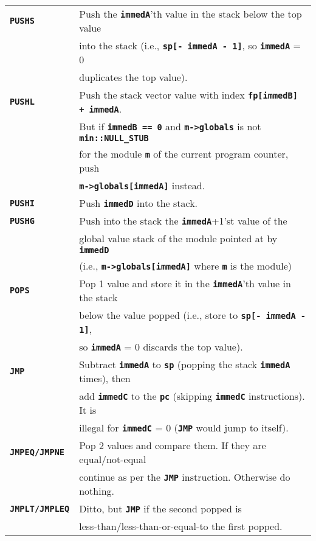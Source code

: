 \documentclass[12pt]{article}
\newcommand{\TT}[1]{{\tt \bfseries #1}}
\newlength{\figurewidth}
\newenvironment{boxedfigure}[1][!btp]%
	{\begin{figure*}[#1]
	 \begin{lrbox}{\figurebox}
	 \begin{minipage}{\figurewidth}

	 \vspace*{1ex}}%
	{
	 \vspace*{1ex}

	 \end{minipage}
	 \end{lrbox}

	 \centering
	 \fbox{\hspace*{0.1in}\usebox{\figurebox}\hspace*{0.1in}}
	 \end{figure*}}
\begin{document}
\begin{boxedfigure}

\begin{center}
\small
\begin{tabular}{|l|l|}
\hline
\TT{PUSHS}
    & Push the \TT{immedA}'th value in the stack below the top value \\
    & into the stack (i.e., \TT{sp[- immedA - 1]},
      so \TT{immedA} = 0 \\
    & duplicates the top value).
\\\hline
\TT{PUSHL}
    & Push the stack vector value with index \TT{fp[immedB] + immedA}. \\
    & But if \TT{immedB == 0} and \TT{m->globals} is not \TT{min::NULL\_STUB} \\
    & for the module \TT{m} of the current program counter, push \\
    & \TT{m->globals[immedA]} instead.
\\\hline
\TT{PUSHI}
    & Push \TT{immedD} into the stack.
\\\hline
\TT{PUSHG}
    & Push into the stack the \TT{immedA}+1'st value of the \\
    & global value stack of the module pointed at by \TT{immedD} \\
    & (i.e., \TT{m->globals[immedA]} where \TT{m} is the module)
\\\hline
\TT{POPS}
    & Pop 1 value and store it in the \TT{immedA}'th value in the stack \\
    & below the value popped (i.e., store to \TT{sp[- immedA - 1]}, \\
    & so \TT{immedA} = 0 discards the top value).
\\\hline
\TT{JMP}
    & Subtract \TT{immedA} to \TT{sp} (popping the stack \TT{immedA} times),
      then \\
    & add \TT{immedC} to the \TT{pc} (skipping \TT{immedC} instructions).
      It is \\
    & illegal for \TT{immedC} = 0 (\TT{JMP} would jump to itself).
\\\hline
\TT{JMPEQ/JMPNE}
    & Pop 2 values and compare them.  If they are equal/not-equal \\
    & continue as per the \TT{JMP} instruction.  Otherwise do nothing.
\\\hline
\TT{JMPLT/JMPLEQ}
    & Ditto, but \TT{JMP} if the second popped is \\
    & less-than/less-than-or-equal-to the first popped.
\\\hline

\end{tabular}
\end{center}
\end{boxedfigure}
\end{document}
